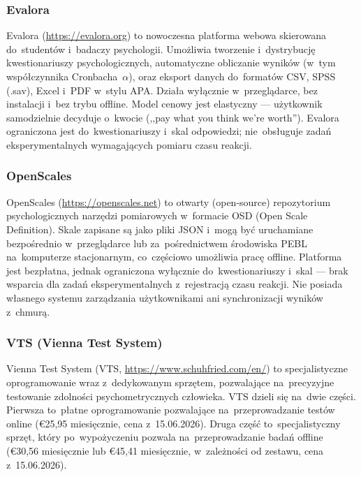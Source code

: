 \documentclass[12pt, a4paper, oneside]{report}
\begin{document}
\subsubsection{Evalora}

Evalora (\url{https://evalora.org}) to nowoczesna platforma webowa
skierowana do~studentów i~badaczy psychologii.
Umożliwia tworzenie i~dystrybucję kwestionariuszy psychologicznych,
automatyczne obliczanie wyników (w~tym współczynnika Cronbacha~$\alpha$),
oraz eksport danych do~formatów CSV, SPSS (.sav), Excel i~PDF
w~stylu APA.
Działa wyłącznie w~przeglądarce, bez instalacji i~bez trybu offline.
Model cenowy jest elastyczny --- użytkownik samodzielnie decyduje
o~kwocie (,,pay what you think we're worth'').
Evalora ograniczona jest do~kwestionariuszy i~skal odpowiedzi;
nie~obsługuje zadań eksperymentalnych wymagających pomiaru czasu reakcji.

\subsubsection{OpenScales}

OpenScales (\url{https://openscales.net}) to otwarty (open-source)
repozytorium psychologicznych narzędzi pomiarowych w~formacie OSD
(Open Scale Definition).
Skale zapisane są jako pliki JSON i~mogą być uruchamiane bezpośrednio
w~przeglądarce lub za~pośrednictwem środowiska PEBL na~komputerze
stacjonarnym, co~częściowo umożliwia pracę offline.
Platforma jest bezpłatna, jednak ograniczona wyłącznie do~kwestionariuszy
i~skal --- brak wsparcia dla zadań eksperymentalnych z~rejestracją czasu
reakcji. Nie posiada własnego systemu zarządzania użytkownikami
ani synchronizacji wyników z~chmurą.

\subsubsection{VTS (Vienna Test System)}

Vienna Test System (VTS, \url{https://www.schuhfried.com/en/}) to
specjalistyczne oprogramowanie wraz z~dedykowanym sprzętem, pozwalające
na~precyzyjne testowanie zdolności psychometrycznych człowieka.
VTS dzieli się na~dwie części. Pierwsza to~płatne oprogramowanie
pozwalające na~przeprowadzanie testów online (€25,95 miesięcznie,
cena z~15.06.2026). Druga część to~specjalistyczny sprzęt, który
po~wypożyczeniu pozwala na~przeprowadzanie badań offline
(€30,56 miesięcznie lub €45,41 miesięcznie, w~zależności od zestawu,
cena z~15.06.2026).
\end{document}
